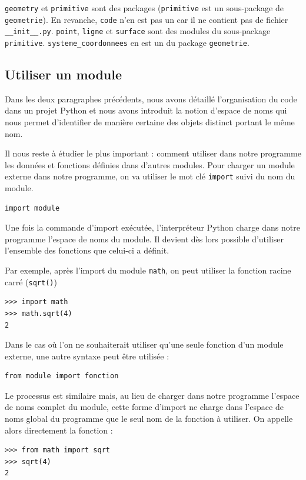 \documentclass[12pt, a4paper]{article}
\begin{document}
\lstinline{geometry} et \lstinline{primitive} sont des packages (\lstinline{primitive} est un sous-package de \lstinline{geometrie}). En revanche, \lstinline{code} n'en est pas un car il ne contient pas de fichier \lstinline{__init__.py}. \lstinline{point}, \lstinline{ligne} et \lstinline{surface} sont des modules du sous-package \lstinline{primitive}. \lstinline{systeme_coordonnees} en est un du package \lstinline{geometrie}.


\subsection{Utiliser un module}
Dans les deux paragraphes précédents, nous avons détaillé l'organisation du code dans un projet Python et nous avons introduit la notion d'espace de noms qui nous permet d'identifier de manière certaine des objets distinct portant le même nom.

Il nous reste à étudier le plus important : comment utiliser dans notre programme les données et fonctions définies dans d'autres modules. Pour charger un module externe dans notre programme, on va utiliser le mot clé \lstinline{import} suivi du nom du module.
\begin{lstlisting}
import module
\end{lstlisting}

Une fois la commande d'import exécutée, l'interpréteur Python charge dans notre programme l'espace de noms du module. Il devient dès lors possible d'utiliser l'ensemble des fonctions que celui-ci a définit.

Par exemple, après l'import du module \lstinline{math}, on peut utiliser la fonction racine carré (\lstinline{sqrt()})
\begin{lstlisting}
>>> import math
>>> math.sqrt(4)
2
\end{lstlisting}

Dans le cas où l'on ne souhaiterait utiliser qu'une seule fonction d'un module externe, une autre syntaxe peut être utilisée :
\begin{lstlisting}
from module import fonction
\end{lstlisting}

Le processus est similaire mais, au lieu de charger dans notre programme l'espace de noms complet du module, cette forme d'import ne charge dans l'espace de noms global du programme que le seul nom de la fonction à utiliser. On appelle alors directement la fonction :
\begin{lstlisting}
>>> from math import sqrt
>>> sqrt(4)
2
\end{lstlisting}
\end{document}
